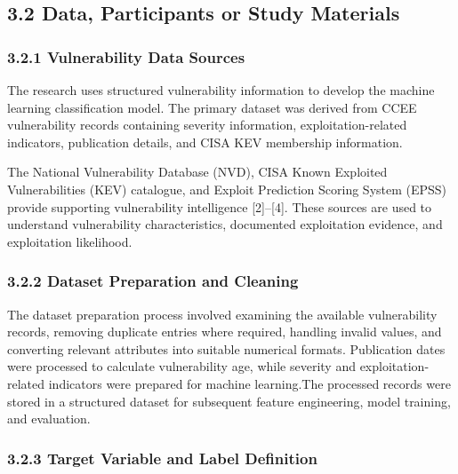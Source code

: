 \documentclass[
]{article}
\begin{document}
\hypertarget{data-participants-or-study-materials}{%
\subsection{3.2 Data, Participants or Study
Materials}\label{data-participants-or-study-materials}}

\hypertarget{vulnerability-data-sources}{%
\subsubsection{3.2.1 Vulnerability Data
Sources}\label{vulnerability-data-sources}}

The research uses structured vulnerability information to develop the
machine learning classification model. The primary dataset was derived
from CCEE vulnerability records containing severity information,
exploitation-related indicators, publication details, and CISA KEV
membership information.

The National Vulnerability Database (NVD), CISA Known Exploited
Vulnerabilities (KEV) catalogue, and Exploit Prediction Scoring System
(EPSS) provide supporting vulnerability intelligence {[}2{]}--{[}4{]}.
These sources are used to understand vulnerability characteristics,
documented exploitation evidence, and exploitation likelihood.

\hypertarget{dataset-preparation-and-cleaning}{%
\subsubsection{3.2.2 Dataset Preparation and
Cleaning}\label{dataset-preparation-and-cleaning}}

The dataset preparation process involved examining the available
vulnerability records, removing duplicate entries where required,
handling invalid values, and converting relevant attributes into
suitable numerical formats. Publication dates were processed to
calculate vulnerability age, while severity and exploitation-related
indicators were prepared for machine learning.The processed records were
stored in a structured dataset for subsequent feature engineering, model
training, and evaluation.

\hypertarget{target-variable-and-label-definition}{%
\subsubsection{3.2.3 Target Variable and Label
Definition}\label{target-variable-and-label-definition}}
\end{document}
